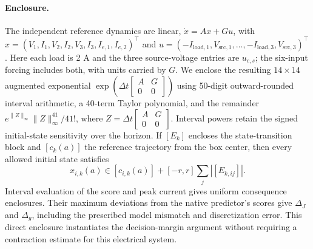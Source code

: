 \paragraph{Enclosure.}
The independent reference dynamics are linear, $\dot x=Ax+Gu$, with
$x=(V_1,I_1,V_2,I_2,V_3,I_3,I_{e,1},I_{e,2})^\top$ and
$u=(-I_{\mathrm{load},1},V_{\mathrm{src},1},\ldots,-I_{\mathrm{load},3},V_{\mathrm{src},3})^\top$.
Here each load is 2 A and the three source-voltage entries are $u_{c,s}$;
the six-input forcing includes both, with units carried by $G$.
We enclose the resulting $14\times14$ augmented exponential
$\exp(\Delta t[\begin{smallmatrix}A&G\\0&0\end{smallmatrix}])$
using 50-digit outward-rounded interval arithmetic, a 40-term Taylor
polynomial, and the remainder
$e^{\|Z\|_\infty}\|Z\|_\infty^{41}/41!$, where
$Z=\Delta t[\begin{smallmatrix}A&G\\0&0\end{smallmatrix}]$.
Interval powers retain the signed initial-state sensitivity over the horizon.
If $[E_k]$ encloses the state-transition block and $[c_k(a)]$ the reference
trajectory from the box center, then every allowed initial state satisfies
\[
 x_{i,k}(a)\in[c_{i,k}(a)]+[-r,r]\sum_j|[E_{k,ij}]|.
\]
Interval evaluation of the score and peak current gives uniform consequence
enclosures. Their maximum deviations from the native predictor's scores give
$\Delta_J$ and $\Delta_g$, including the prescribed model mismatch and
discretization error. This direct enclosure instantiates the decision-margin
argument without requiring a contraction estimate for this electrical system.

